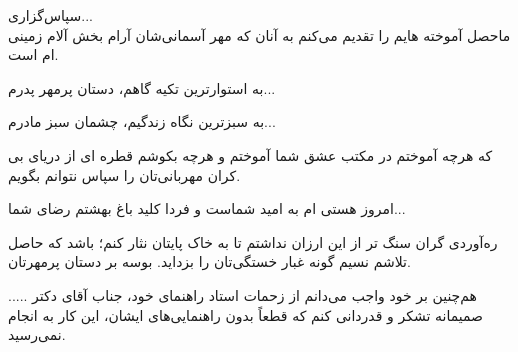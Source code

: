 %
%		


\newpage
{\nastaliq\LARGE
سپاس‌گزاری...
}
\\[2cm]
 ماحصل آموخته هایم را تقدیم می‌کنم به آنان که مهر آسمانی‌شان آرام بخش آلام زمینی ام است.
 
به استوارترین تکیه گاهم، دستان پرمهر پدرم...

به سبزترین نگاه زندگیم، چشمان سبز مادرم...

که هرچه آموختم در مکتب عشق شما آموختم و هرچه بکوشم قطره ای از دریای بی کران مهربانی‌تان را سپاس نتوانم بگویم.

امروز هستی ام به امید شماست و فردا کلید باغ بهشتم رضای شما...

ره‌آوردی گران سنگ تر از این ارزان نداشتم تا به خاک پایتان نثار کنم؛ باشد که حاصل تلاشم نسیم گونه غبار خستگی‌تان را بزداید. بوسه بر دستان پرمهرتان.

هم‌چنین بر خود واجب می‌دانم از زحمات استاد راهنمای خود، جناب آقای دکتر ..... صمیمانه تشکر و  قدردانی کنم  که قطعاً بدون راهنمایی‌های‌ ایشان، این کار به انجام نمی‌رسید. 
